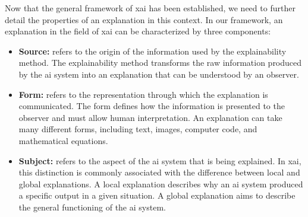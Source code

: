 Now that the general framework of \gls{xai} has been established, we need to further detail the properties of an explanation in this context.
In our framework, an explanation in the field of \gls{xai} can be characterized by three components:
\begin{itemize}
    \item \textbf{Source:}\label{item:source} refers to the origin of the information used by the explainability method.
    The explainability method transforms the raw information produced by the \gls{ai} system into an explanation that can be understood by an observer.

    \item \textbf{Form:}\label{item:form} refers to the representation through which the explanation is communicated.
    The form defines how the information is presented to the observer and must allow human interpretation.
    An explanation can take many different forms, including text, images, computer code, and mathematical equations.

    \item \textbf{Subject:}\label{item:subject} refers to the aspect of the \gls{ai} system that is being explained.
    In \gls{xai}, this distinction is commonly associated with the difference between local and global explanations.
    A local explanation describes why an \gls{ai} system produced a specific output in a given situation.
    A global explanation aims to describe the general functioning of the \gls{ai} system.
\end{itemize}

